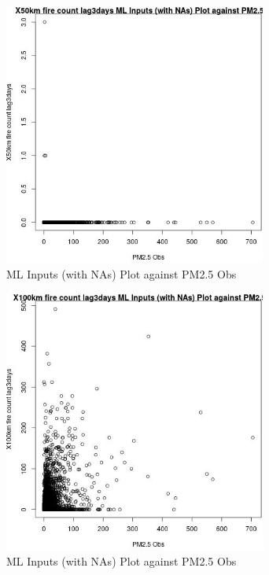 \begin{figure} 
\centering  
\includegraphics[width=0.77\textwidth]{Code_Outputs/Report_ML_input_PM25_Step4_part_e_de_duplicated_aves_compiled_2019-05-14wNAs_X50km_fire_count_lag3daysvPM25_Obs.jpg} 
\caption{\label{fig:Report_ML_input_PM25_Step4_part_e_de_duplicated_aves_compiled_2019-05-14wNAsX50km_fire_count_lag3daysvPM25_Obs}ML Inputs (with NAs) Plot against PM2.5 Obs} 
\end{figure} 
 

\begin{figure} 
\centering  
\includegraphics[width=0.77\textwidth]{Code_Outputs/Report_ML_input_PM25_Step4_part_e_de_duplicated_aves_compiled_2019-05-14wNAs_X100km_fire_count_lag3daysvPM25_Obs.jpg} 
\caption{\label{fig:Report_ML_input_PM25_Step4_part_e_de_duplicated_aves_compiled_2019-05-14wNAsX100km_fire_count_lag3daysvPM25_Obs}ML Inputs (with NAs) Plot against PM2.5 Obs} 
\end{figure} 
 

